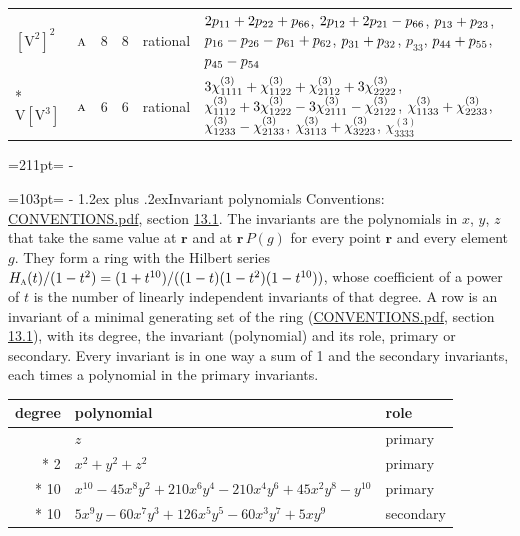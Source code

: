 \documentclass[10pt,a4paper]{article}
\makeatletter
\renewcommand\section{\@startsection{section}{1}{\z@}{-3ex plus -1ex minus -.2ex}%
  {1.2ex plus .2ex}{\normalfont\large\sffamily\bfseries\color{parttitle}}}
\newcommand{\needspace}[1]{\par\penalty-100\begingroup\dimen0=#1\relax\dimen2=\pagegoal
  \advance\dimen2-\pagetotal\ifdim\dimen0>\dimen2\relax\ifdim\dimen2>0pt\vfil\break\fi\fi
  \endgroup}
\numberwithin{equation}{section}
\newcommand{\irr}[1]{\text{\normalfont\scshape #1}}
\newcommand{\pointr}{\mathbf{r}}
\newcommand{\jahn}[1]{\mathrm{#1}}
\newlength{\fillwidth}\newlength{\cellwidth}\newlength{\colwidth}
\newcommand{\signbreak}{\penalty100\relax}
\makeatother
\begin{document}
{\begin{longtable}{@{}llrrl>{\RaggedRight\arraybackslash}p{\fillwidth}@{}}
$\jahn{[V^{2}]^{2}}$ & $\irr{a}$ & 8 & 8 & rational & $2p_{11} +\signbreak 2p_{22} +\signbreak p_{66}$, $2p_{12} +\signbreak 2p_{21} -\signbreak p_{66}$, $p_{13} +\signbreak p_{23}$, $p_{16} -\signbreak p_{26} -\signbreak p_{61} +\signbreak p_{62}$, $p_{31} +\signbreak p_{32}$, $p_{33}$, $p_{44} +\signbreak p_{55}$, $p_{45} -\signbreak p_{54}$\\*
$\jahn{V[V^{3}]}$ & $\irr{a}$ & 6 & 6 & rational & $3\chi^{(3)}_{1111} +\signbreak \chi^{(3)}_{1122} +\signbreak \chi^{(3)}_{2112} +\signbreak 3\chi^{(3)}_{2222}$, $\chi^{(3)}_{1112} +\signbreak 3\chi^{(3)}_{1222} -\signbreak 3\chi^{(3)}_{2111} -\signbreak \chi^{(3)}_{2122}$, $\chi^{(3)}_{1133} +\signbreak \chi^{(3)}_{2233}$, $\chi^{(3)}_{1233} -\signbreak \chi^{(3)}_{2133}$, $\chi^{(3)}_{3113} +\signbreak \chi^{(3)}_{3223}$, $\chi^{(3)}_{3333}$\\
\bottomrule\end{longtable}}
\needspace{211pt}
\needspace{103pt}
\section{Invariant polynomials}\label{s:invariant_polynomials}
Conventions: \href{../../CONVENTIONS.pdf}{CONVENTIONS.pdf}, section \href{../../CONVENTIONS.pdf\#conv.13.1}{13.1}.
The invariants are the polynomials in $x$, $y$, $z$ that take the same value at $\pointr$ and at $\pointr\,P(g)$ for every point $\pointr$ and every element $g$. They form a ring with the Hilbert series $H_{\irr{a}}(t)/(1-t^{2}) = (1 + t^{10})/((1-t)(1-t^{2})(1-t^{10}))$, whose coefficient of a power of $t$ is the number of linearly independent invariants of that degree. \label{n:head.degree}\label{n:head.role}A row is an invariant of a minimal generating set of the ring (\href{../../CONVENTIONS.pdf}{CONVENTIONS.pdf}, section \href{../../CONVENTIONS.pdf\#conv.13.1}{13.1}), with its degree, the invariant (polynomial) and its role, primary or secondary. Every invariant is in one way a sum of 1 and the secondary invariants, each times a polynomial in the primary invariants.
{\small\begin{longtable}{@{}rll@{}}\toprule
degree & polynomial & role\\\midrule\endhead
\bottomrule\endfoot\endlastfoot
1 & $z$ & primary\\*
2 & $x^{2} + y^{2} + z^{2}$ & primary\\*
10 & $x^{10} - 45x^{8}y^{2} + 210x^{6}y^{4} - 210x^{4}y^{6} + 45x^{2}y^{8} - y^{10}$ & primary\\*
10 & $5x^{9}y - 60x^{7}y^{3} + 126x^{5}y^{5} - 60x^{3}y^{7} + 5xy^{9}$ & secondary\\
\bottomrule\end{longtable}}
\end{document}

